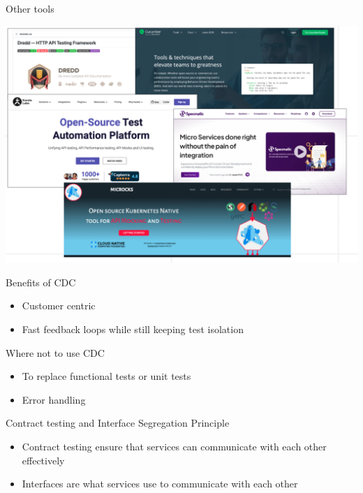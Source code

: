 

\begin{frame}{Other tools}
    \begin{center}
        \includegraphics[width=.8\textwidth]{./assets/other_tools}
    \end{center}
\end{frame}


\begin{frame}{Benefits of CDC}

    \begin{itemize}
        \item Customer centric
        \item Fast feedback loops while still keeping test isolation
    \end{itemize}

\end{frame}


\begin{frame}{Where not to use CDC}
    \begin{itemize}
        \item To replace functional tests or unit tests
        \item Error handling
    \end{itemize}
    \end{frame}


\begin{frame}{Contract testing and Interface Segregation Principle}
    \begin{itemize}
        \item<1-2> Contract testing ensure that services can communicate with each other effectively
        \item<2> Interfaces are what services use to communicate with each other
    \end{itemize}
\end{frame}
